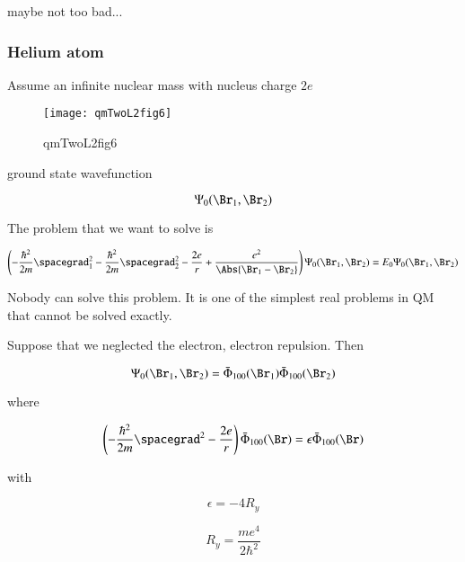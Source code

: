 maybe not too bad...

\subsubsection{Helium atom}

Assume an infinite nuclear mass with nucleus charge $2 e$

\begin{figure}[htp]
\centering
\texttt{[image: qmTwoL2fig6]}
\caption{qmTwoL2fig6}\label{fig:qmTwoL2:6}
\end{figure}

ground state wavefunction

\begin{equation}\label{eqn:qmTwoL2:490}
\Psi_0(\Br_1, \Br_2)
\end{equation}

The problem that we want to solve is

\begin{equation}\label{eqn:qmTwoL2:510}
\left(
-\frac{\hbar^2}{2 m} \spacegrad_1^2
-\frac{\hbar^2}{2 m} \spacegrad_2^2
- \frac{2 e}{r}
+
\frac{e^2}{\Abs{\Br_1 - \Br_2}}
\right)
\Psi_0(\Br_1, \Br_2) = E_0 \Psi_0(\Br_1, \Br_2)
\end{equation}

Nobody can solve this problem.  It is one of the simplest real problems in QM that cannot be solved exactly.

Suppose that we neglected the electron, electron repulsion.  Then

\begin{equation}\label{eqn:qmTwoL2:530}
\Psi_0(\Br_1, \Br_2)
=
\bar{\Phi}_{100}(\Br_1)
\bar{\Phi}_{100}(\Br_2)
\end{equation}

where

\begin{equation}\label{eqn:qmTwoL2:550}
\left( -\frac{\hbar^2}{2 m} \spacegrad^2
- \frac{2 e}{r} \right)
\bar{\Phi}_{100}(\Br) = \epsilon \bar{\Phi}_{100}(\Br)
\end{equation}

with

\begin{equation}\label{eqn:qmTwoL2:570}
\epsilon = - 4 R_y
\end{equation}

\begin{equation}\label{eqn:qmTwoL2:590}
R_y = \frac{m e^4}{2 \hbar^2}
\end{equation}

